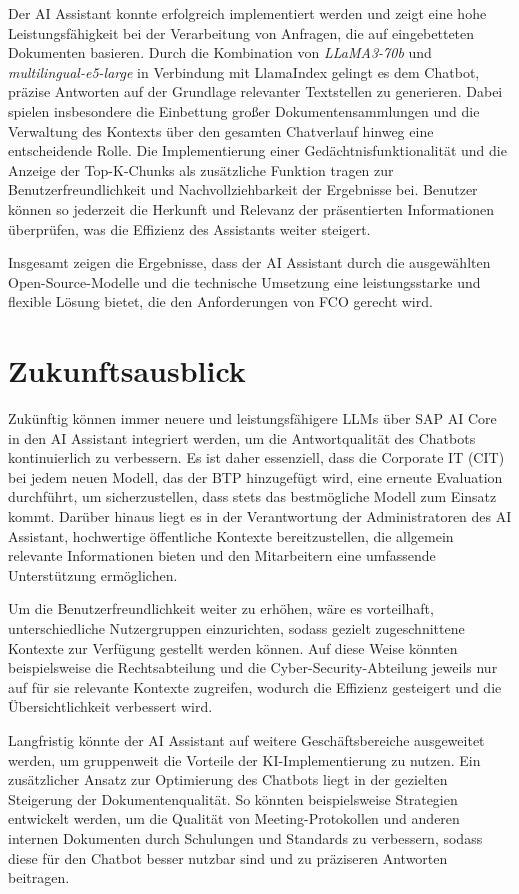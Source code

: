 Der AI Assistant konnte erfolgreich implementiert werden und zeigt eine hohe Leistungsfähigkeit bei der Verarbeitung von Anfragen, die auf eingebetteten Dokumenten basieren. 
Durch die Kombination von \textit{LLaMA3-70b} und \textit{multilingual-e5-large} in Verbindung mit LlamaIndex gelingt es dem Chatbot, präzise Antworten auf der Grundlage relevanter Textstellen zu generieren. 
Dabei spielen insbesondere die Einbettung großer Dokumentensammlungen und die Verwaltung des Kontexts über den gesamten Chatverlauf hinweg eine entscheidende Rolle. 
Die Implementierung einer Gedächtnisfunktionalität und die Anzeige der Top-K-Chunks als zusätzliche Funktion tragen zur Benutzerfreundlichkeit und Nachvollziehbarkeit der Ergebnisse bei. 
Benutzer können so jederzeit die Herkunft und Relevanz der präsentierten Informationen überprüfen, was die Effizienz des Assistants weiter steigert.

Insgesamt zeigen die Ergebnisse, dass der AI Assistant durch die ausgewählten Open-Source-Modelle und die technische Umsetzung eine leistungsstarke und flexible Lösung bietet, die den Anforderungen von \ac{FCO} gerecht wird.

\section{Zukunftsausblick}

Zukünftig können immer neuere und leistungsfähigere \acp{LLM} über SAP AI Core in den AI Assistant integriert werden, um die Antwortqualität des Chatbots kontinuierlich zu verbessern. 
Es ist daher essenziell, dass die Corporate IT (\ac{CIT}) bei jedem neuen Modell, das der \ac{BTP} hinzugefügt wird, eine erneute Evaluation durchführt, um sicherzustellen, dass stets das bestmögliche Modell zum Einsatz kommt. 
Darüber hinaus liegt es in der Verantwortung der Administratoren des AI Assistant, hochwertige öffentliche Kontexte bereitzustellen, 
die allgemein relevante Informationen bieten und den Mitarbeitern eine umfassende Unterstützung ermöglichen.

Um die Benutzerfreundlichkeit weiter zu erhöhen, wäre es vorteilhaft, unterschiedliche Nutzergruppen einzurichten, sodass gezielt zugeschnittene Kontexte zur Verfügung gestellt werden können. 
Auf diese Weise könnten beispielsweise die Rechtsabteilung und die Cyber-Security-Abteilung jeweils nur auf für sie relevante Kontexte zugreifen, wodurch die Effizienz gesteigert und die Übersichtlichkeit verbessert wird.

Langfristig könnte der AI Assistant auf weitere Geschäftsbereiche ausgeweitet werden, um gruppenweit die Vorteile der \ac{KI}-Implementierung zu nutzen. 
Ein zusätzlicher Ansatz zur Optimierung des Chatbots liegt in der gezielten Steigerung der Dokumentenqualität. 
So könnten beispielsweise Strategien entwickelt werden, um die Qualität von Meeting-Protokollen und anderen internen Dokumenten durch Schulungen und Standards zu verbessern, 
sodass diese für den Chatbot besser nutzbar sind und zu präziseren Antworten beitragen.


